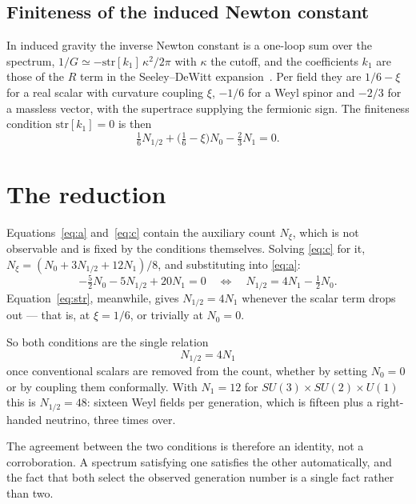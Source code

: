 \documentclass[aps,prd,twocolumn,superscriptaddress,nofootinbib,10pt]{revtex4-2}
\begin{document}
\subsection{Finiteness of the induced Newton constant}

In induced gravity the inverse Newton constant is a one-loop sum over the spectrum,
$1/G \simeq -\mathrm{str}[k_1]\,\kappa^2/2\pi$ with $\kappa$ the cutoff, and the coefficients $k_1$
are those of the $R$ term in the Seeley--DeWitt expansion~\cite{Visser2002,ChristensenFulling1977}.
Per field they are $1/6 - \xi$ for a real scalar with curvature coupling $\xi$, $-1/6$ for a Weyl
spinor and $-2/3$ for a massless vector, with the supertrace supplying the fermionic sign. The
finiteness condition $\mathrm{str}[k_1] = 0$ is then
%
\begin{equation}
  \tfrac{1}{6} N_{1/2} + \big(\tfrac{1}{6} - \xi\big) N_0 - \tfrac{2}{3} N_1 = 0 .
  \label{eq:str}
\end{equation}

\section{The reduction}\label{sec:reduction}

Equations~\eqref{eq:a} and~\eqref{eq:c} contain the auxiliary count $N_\xi$, which is not
observable and is fixed by the conditions themselves. Solving \eqref{eq:c} for it,
$N_\xi = (N_0 + 3N_{1/2} + 12N_1)/8$, and substituting into \eqref{eq:a}:
%
\begin{equation}
  -\tfrac{5}{2} N_0 - 5 N_{1/2} + 20 N_1 = 0
  \quad\Longleftrightarrow\quad
  N_{1/2} = 4N_1 - \tfrac{1}{2} N_0 .
  \label{eq:reduced}
\end{equation}
%
Equation~\eqref{eq:str}, meanwhile, gives $N_{1/2} = 4N_1$ whenever the scalar term drops out ---
that is, at $\xi = 1/6$, or trivially at $N_0 = 0$.

So both conditions are the single relation
%
\begin{equation}
  \boxed{\;N_{1/2} = 4 N_1\;}
  \label{eq:same}
\end{equation}
%
once conventional scalars are removed from the count, whether by setting $N_0 = 0$ or by coupling
them conformally. With $N_1 = 12$ for $SU(3) \times SU(2) \times U(1)$ this is
$N_{1/2} = 48$: sixteen Weyl fields per generation, which is fifteen plus a right-handed neutrino,
three times over.

The agreement between the two conditions is therefore an identity, not a corroboration. A
spectrum satisfying one satisfies the other automatically, and the fact that both select the
observed generation number is a single fact rather than two.
\end{document}
